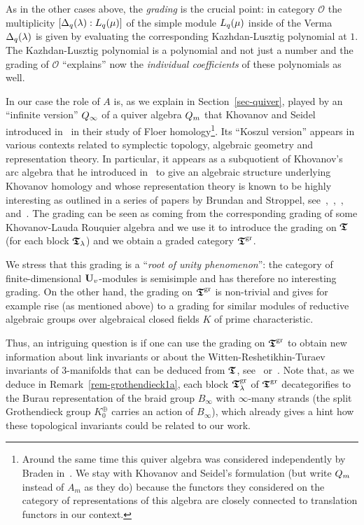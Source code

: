 As in the other cases above, the \textit{grading} 
is the crucial point: in category $\mathcal O$ the 
multiplicity $[\Delta_q({\lambda}):L_q({\mu})]$ of the 
simple module $L_q({\mu})$ inside of the Verma 
$\Delta_q({\lambda})$ is given by evaluating the 
corresponding Kazhdan-Lusztig polynomial at $1$. 
The Kazhdan-Lusztig polynomial is a polynomial 
and not just a number and the grading of $\mathcal O$ 
``explains'' now the \textit{individual coefficients} of these polynomials as well.



In our case the role of $A$ is, as we explain 
in Section~\ref{sec-quiver}, played by an 
``infinite version'' $Q_{\infty}$ of a quiver algebra 
$Q_{m}$ that Khovanov and Seidel introduced in~\cite{ks1} 
in their study of Floer homology\footnote{Around the 
same time this quiver algebra was considered 
independently by Braden in~\cite{bra}. We stay with Khovanov and Seidel's formulation 
(but write $Q_{m}$ instead of $A_m$ as they do)
because the functors they considered on the category 
of representations of this algebra are closely 
connected to translation functors in our context.}. 
Its ``Koszul version'' appears in various contexts 
related to symplectic topology, algebraic geometry and representation theory. 
In particular, it appears as a subquotient of Khovanov's arc algebra that 
he introduced in~\cite{kh4} to give an algebraic structure 
underlying Khovanov homology and whose representation 
theory is known to be highly interesting as outlined 
in a series of papers by Brundan and Stroppel, 
see~\cite{bs1},~\cite{bs2},~\cite{bs3},~\cite{bs4} 
and~\cite{bs5}. The grading can be seen as coming from the 
corresponding grading of some Khovanov-Lauda Rouquier algebra and we use it 
to introduce the grading on $\boldsymbol{\mathfrak{T}}$ (for each block $\boldsymbol{\mathfrak{T}}_{\lambda}$) 
and we obtain a graded category $\boldsymbol{\mathfrak{T}}^{\mathrm{gr}}$. 



We stress that this grading is a ``\textit{root of unity phenomenon}'': 
the category of finite-dimensional $\boldsymbol{\mathrm{U}}_v$-modules is 
semisimple and has therefore no interesting grading. 
On the other hand, the grading on $\boldsymbol{\mathfrak{T}}^{\mathrm{gr}}$ is non-trivial 
and gives for example rise (as mentioned above) to a 
grading for similar modules of reductive algebraic groups over 
algebraical closed fields $K$ of prime characteristic.



Thus, an intriguing question is if one can use 
the grading on $\boldsymbol{\mathfrak{T}}^{\mathrm{gr}}$ to obtain new information 
about link invariants or about the 
Witten-Reshetikhin-Turaev invariants 
of $3$-manifolds that can be deduced from $\boldsymbol{\mathfrak{T}}$, see~\cite{an1} 
or~\cite{tur}. Note 
that, as we deduce in Remark~\ref{rem-grothendieck1a}, 
each block $\boldsymbol{\mathfrak{T}}_{\lambda}^{\mathrm{gr}}$ of $\boldsymbol{\mathfrak{T}}^{\mathrm{gr}}$ decategorifies to the 
Burau representation of the braid group 
$B_{\infty}$ with $\infty$-many strands 
(the split Grothendieck group $K_0^{\oplus}$ carries an action of $B_{\infty}$), 
which already gives a hint how these topological invariants could be related to our work.



